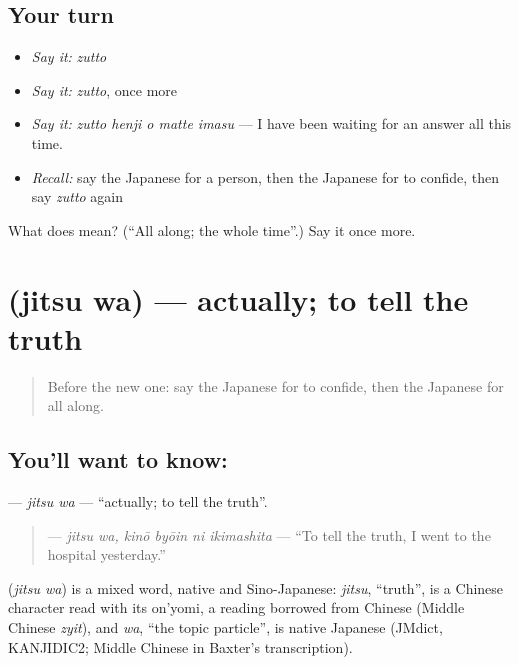 \subsection*{Your turn}
\begin{itemize}
\raggedright
  \item \emph{Say it:} \emph{zutto}
  \item \emph{Say it:} \emph{zutto}, once more
  \item \emph{Say it:} \emph{zutto henji o matte imasu} — I have been waiting for an answer all this time.
  \item \emph{Recall:} say the Japanese for a person, then the Japanese for to confide, then say \emph{zutto} again
\end{itemize}

\begin{tcolorbox}[breakable,colback=teal!4,colframe=teal!35!black,title={Before you move on}]
What does  mean? (\textquotedblleft{}All along; the whole time\textquotedblright{}.) Say it once more.
\end{tcolorbox}
\section[\texorpdfstring{\ja{じつは} (jitsu wa)}{じつは (jitsu wa)}]{ (jitsu wa) — actually; to tell the truth}

\label{lesson:JA-C310-jitsu-wa}



\begin{quote}
Before the new one: say the Japanese for to confide, then the Japanese for all along.
\end{quote}

\subsection*{You'll want to know: }
\textbf{} — \emph{jitsu wa} — \textquotedblleft{}actually; to tell the truth\textquotedblright{}.

\begin{quote}
\textbf{  } — \emph{jitsu wa, kinō byōin ni ikimashita} — \textquotedblleft{}To tell the truth, I went to the hospital yesterday.\textquotedblright{}
\end{quote}

\begin{cousinweb}
\textbf{} (\emph{jitsu wa}) is a mixed word, native and Sino-Japanese: \emph{jitsu}, \textquotedblleft{}truth\textquotedblright{}, is a Chinese character read with its on'yomi, a reading borrowed from Chinese (Middle Chinese \emph{zyit}), and \emph{wa}, \textquotedblleft{}the topic particle\textquotedblright{}, is native Japanese (JMdict, KANJIDIC2; Middle Chinese in Baxter's transcription).
\end{cousinweb}

